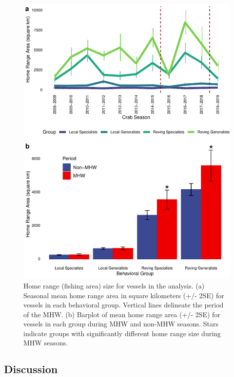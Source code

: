\documentclass[9pt,twocolumn,twoside,lineno]{pnas-new}
\begin{document}
\begin{figure}%
\includegraphics[width=\linewidth]{fig_homerange.pdf}
\caption{Home range (fishing area) size for vessels in the analysis. (a) Seasonal mean home range area in square kilometers (+/- 2SE) for vessels in each behavioral group. Vertical lines delineate the period of the MHW. (b) Barplot of mean home range area (+/- 2SE) for vessels in each group during MHW and non-MHW seasons. Stars indicate groups with significantly different home range size during MHW seasons.}
\label{fig:homerange}
\end{figure}

\hypertarget{discussion}{%
\subsection*{Discussion}\label{discussion}}
\end{document}
